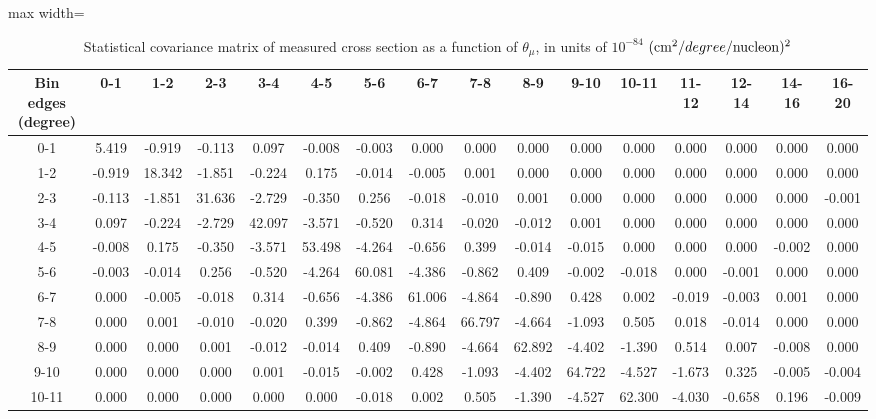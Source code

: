 \documentclass[11pt]{article}
\begin{document}
\clearpage

\begin{table}
  \centering
  \renewcommand{\arraystretch}{1.15}
  \caption{Statistical covariance matrix of measured cross section as a function of $\theta_{\mu}$, in units of $10^{-84}$ $(\mbox{cm}^2/degree/\mathrm{nucleon})^2$}
  \begin{adjustbox}{max width=\textwidth}
    \begin{tabular}{c||ccccccccccccccc}
      Bin edges (degree) & 0-1 & 1-2 & 2-3 & 3-4 & 4-5 & 5-6 & 6-7 & 7-8 & 8-9 & 9-10 & 10-11 & 11-12 & 12-14 & 14-16 & 16-20\\
      \hline
      \hline
      0-1 & 5.419 & -0.919 & -0.113 & 0.097 & -0.008 & -0.003 & 0.000 & 0.000 & 0.000 & 0.000 & 0.000 & 0.000 & 0.000 & 0.000 & 0.000\\
      1-2 & -0.919 & 18.342 & -1.851 & -0.224 & 0.175 & -0.014 & -0.005 & 0.001 & 0.000 & 0.000 & 0.000 & 0.000 & 0.000 & 0.000 & 0.000\\
      2-3 & -0.113 & -1.851 & 31.636 & -2.729 & -0.350 & 0.256 & -0.018 & -0.010 & 0.001 & 0.000 & 0.000 & 0.000 & 0.000 & 0.000 & -0.001\\
      3-4 & 0.097 & -0.224 & -2.729 & 42.097 & -3.571 & -0.520 & 0.314 & -0.020 & -0.012 & 0.001 & 0.000 & 0.000 & 0.000 & 0.000 & 0.000\\
      4-5 & -0.008 & 0.175 & -0.350 & -3.571 & 53.498 & -4.264 & -0.656 & 0.399 & -0.014 & -0.015 & 0.000 & 0.000 & 0.000 & -0.002 & 0.000\\
      5-6 & -0.003 & -0.014 & 0.256 & -0.520 & -4.264 & 60.081 & -4.386 & -0.862 & 0.409 & -0.002 & -0.018 & 0.000 & -0.001 & 0.000 & 0.000\\
      6-7 & 0.000 & -0.005 & -0.018 & 0.314 & -0.656 & -4.386 & 61.006 & -4.864 & -0.890 & 0.428 & 0.002 & -0.019 & -0.003 & 0.001 & 0.000\\
      7-8 & 0.000 & 0.001 & -0.010 & -0.020 & 0.399 & -0.862 & -4.864 & 66.797 & -4.664 & -1.093 & 0.505 & 0.018 & -0.014 & 0.000 & 0.000\\
      8-9 & 0.000 & 0.000 & 0.001 & -0.012 & -0.014 & 0.409 & -0.890 & -4.664 & 62.892 & -4.402 & -1.390 & 0.514 & 0.007 & -0.008 & 0.000\\
      9-10 & 0.000 & 0.000 & 0.000 & 0.001 & -0.015 & -0.002 & 0.428 & -1.093 & -4.402 & 64.722 & -4.527 & -1.673 & 0.325 & -0.005 & -0.004\\
      10-11 & 0.000 & 0.000 & 0.000 & 0.000 & 0.000 & -0.018 & 0.002 & 0.505 & -1.390 & -4.527 & 62.300 & -4.030 & -0.658 & 0.196 & -0.009\\

\end{tabular}
\end{adjustbox}
\end{table}
\end{document}
